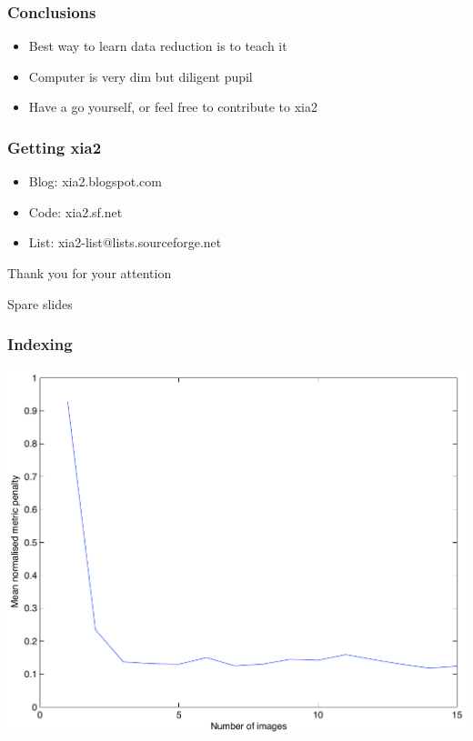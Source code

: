 \documentclass[slides,compress]{beamer}
\begin{document}
\begin{frame}
\frametitle{Conclusions}
\begin{itemize}
\item{Best way to learn data reduction is to teach it}
\item{Computer is very dim but diligent pupil}
\item{Have a go yourself, or feel free to contribute to xia2}
\end{itemize}
\end{frame}

\begin{frame}
\frametitle{Getting xia2}
\begin{itemize}
\item{Blog: xia2.blogspot.com}
\item{Code: xia2.sf.net}
\item{List: xia2-list@lists.sourceforge.net}
\end{itemize}
\end{frame}

\begin{frame}
\begin{center}
\Huge Thank you for your attention
\end{center}
\end{frame}

\begin{frame}
\begin{center}
\Huge Spare slides
\end{center}
\end{frame}

\begin{frame}
\frametitle{Indexing}
\hspace{3cm}
\includegraphics[scale=0.5]{figures/no_images.pdf}
\end{frame}
\end{document}
